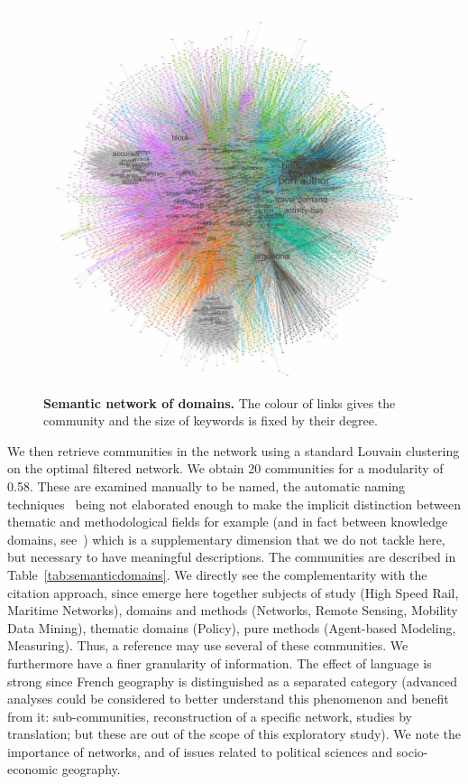 \documentclass[10pt]{article}
\begin{document}
\begin{figure}
\includegraphics[width=\linewidth]{figures/A-quantepistemo-semanticnw.jpg}
\caption{\textbf{Semantic network of domains.} The colour of links gives the community and the size of keywords is fixed by their degree.\label{fig:semanticnw}}
\end{figure}




We then retrieve communities in the network using a standard Louvain clustering on the optimal filtered network. We obtain 20 communities for a modularity of 0.58. These are examined manually to be named, the automatic naming techniques~\cite{yang2000improving} being not elaborated enough to make the implicit distinction between thematic and methodological fields for example (and in fact between knowledge domains, see~\cite{raimbault2017applied}) which is a supplementary dimension that we do not tackle here, but necessary to have meaningful descriptions. The communities are described in Table~\ref{tab:semanticdomains}. We directly see the complementarity with the citation approach, since emerge here together subjects of study (High Speed Rail, Maritime Networks), domains and methods (Networks, Remote Sensing, Mobility Data Mining), thematic domains (Policy), pure methods (Agent-based Modeling, Measuring). Thus, a reference may use several of these communities. We furthermore have a finer granularity of information. The effect of language is strong since French geography is distinguished as a separated category (advanced analyses could be considered to better understand this phenomenon and benefit from it: sub-communities, reconstruction of a specific network, studies by translation; but these are out of the scope of this exploratory study). We note the importance of networks, and of issues related to political sciences and socio-economic geography.
\end{document}
